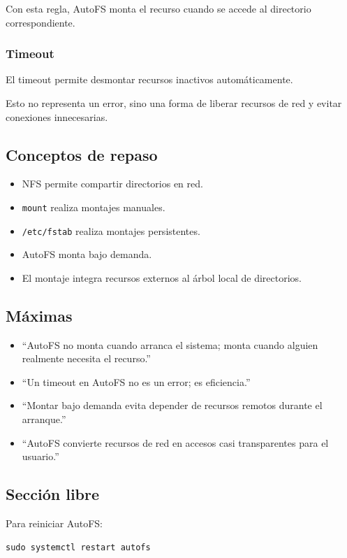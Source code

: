 \documentclass[11pt, letterpaper]{article}
\begin{document}
Con esta regla, AutoFS monta el recurso cuando se accede al directorio correspondiente.
\subsubsection{Timeout}
\label{sec:org72fb13d}

El timeout permite desmontar recursos inactivos automáticamente.

Esto no representa un error, sino una forma de liberar recursos de red y evitar conexiones innecesarias.
\subsection{Conceptos de repaso}
\label{sec:org54083b8}

\begin{itemize}
\item NFS permite compartir directorios en red.
\item \texttt{mount} realiza montajes manuales.
\item \texttt{/etc/fstab} realiza montajes persistentes.
\item AutoFS monta bajo demanda.
\item El montaje integra recursos externos al árbol local de directorios.
\end{itemize}
\subsection{Máximas}
\label{sec:org6c503f6}

\begin{itemize}
\item “AutoFS no monta cuando arranca el sistema; monta cuando alguien realmente necesita el recurso.”
\item “Un timeout en AutoFS no es un error; es eficiencia.”
\item “Montar bajo demanda evita depender de recursos remotos durante el arranque.”
\item “AutoFS convierte recursos de red en accesos casi transparentes para el usuario.”
\end{itemize}
\subsection{Sección libre}
\label{sec:orgdc7bce0}

Para reiniciar AutoFS:

\begin{verbatim}
sudo systemctl restart autofs
\end{verbatim}
\end{document}
